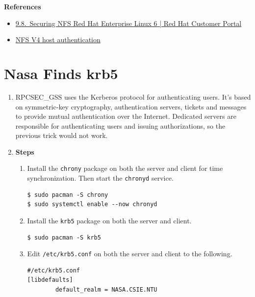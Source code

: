 \documentclass[12pt, a4paper]{article}
\begin{document}
  \textbf{References}
  \begin{itemize}
    \item \href{https://access.redhat.com/documentation/en-us/red_hat_enterprise_linux/6/html/storage_administration_guide/s1-nfs-security#s3-nfs-security-hosts-nonnfsv4}{9.8. Securing NFS Red Hat Enterprise Linux 6 | Red Hat Customer Portal}
    \item \href{https://www.ibm.com/docs/en/aix/7.1?topic=management-nfs-v4-host-authentication}{NFS V4 host authentication}
  \end{itemize}

  \pagebreak
  \section{Nasa Finds krb5}
  \begin{enumerate}[label=(\alph*)]
    \item RPCSEC\_GSS uses the Kerberos protocol for authenticating users. It's based on
    symmetric-key cryptography, authentication servers, tickets and messages to provide
    mutual authentication over the Internet. Dedicated servers are responsible for
    authenticating users and issuing authorizations, so the previous trick would not
    work.

    \item \textbf{Steps}
    \begin{enumerate}[label=(\arabic*)]
      \item Install the \verb|chrony| package on both the server and client for time
      synchronization. Then start the \verb|chronyd| service.
      \begin{Verbatim}[frame=single]
$ sudo pacman -S chrony
$ sudo systemctl enable --now chronyd
      \end{Verbatim}
      \item Install the \verb|krb5| package on both the server and client.
      \begin{Verbatim}[frame=single]
$ sudo pacman -S krb5
      \end{Verbatim}
      \item Edit \verb|/etc/krb5.conf| on both the server and client to the following.
      \begin{Verbatim}[frame=single]
#/etc/krb5.conf
[libdefaults]
        default_realm = NASA.CSIE.NTU


\end{Verbatim}
\end{enumerate}
\end{enumerate}
\end{document}
